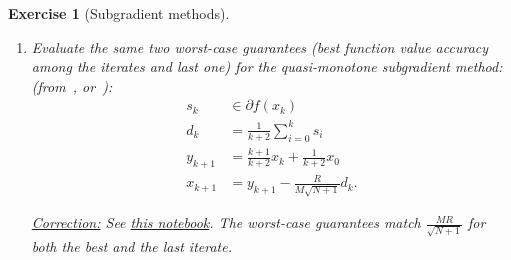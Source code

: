 \documentclass[11pt,a4paper]{article}
\newcommand{\correction}[1]{{{\color{blue}\underline{Correction:} #1}}}
\newcommand{\correction}[1]{}
\newtheorem{exercise}{Exercise}
\begin{document}
\begin{exercise}[Subgradient methods]
\begin{enumerate}
	\item Evaluate the same two worst-case guarantees (best function value accuracy among the iterates and last one) for the quasi-monotone subgradient method: (from~\cite{nesterov2015quasi}, or~\cite{drori2018efficient}):
	\begin{equation*}
	\begin{aligned}
	s_{k}&\in\partial f(x_{k})\\
	d_{k}&=\frac{1}{k+2}\sum_{i=0}^{k}s_i\\
	y_{k+1}&=\frac{k+1}{k+2}x_k+\frac{1}{k+2}x_0\\
	x_{k+1}&=y_{k+1}-\frac{R}{M\sqrt{N+1}}d_k.
	\end{aligned}
	\end{equation*}
	
	\correction{ See \href{https://github.com/PerformanceEstimation/Learning-Performance-Estimation/tree/main/Codes/Jupyter/Exercise08.ipynb}{this notebook}. The worst-case guarantees match $\frac{MR}{\sqrt{N+1}}$ for both the best and the last iterate.}
	\end{enumerate}
	
	\end{exercise}
	
\end{document}
